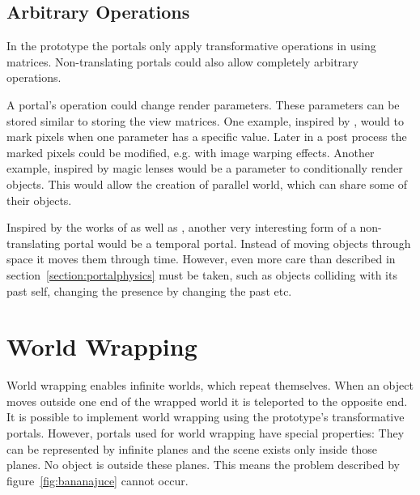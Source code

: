 \subsection{Arbitrary Operations}

In the prototype the portals only apply transformative operations in using matrices. Non-translating portals could also allow completely arbitrary operations.

A portal's operation could change render parameters. These parameters can be stored similar to storing the view matrices. One example, inspired by \textcite{borst:2009:real}, would to mark pixels when one parameter has a specific value. Later in a post process the marked pixels could be modified, e.g. with image warping effects. Another example, inspired by magic lenses would be a parameter to conditionally render objects. This would allow the creation of parallel world, which can share some of their objects.

Inspired by the works of \textcite{ryall:2005:temporal} as well as \textcite{tiesel:2009:composable}, another very interesting form of a non-translating portal would be a temporal portal. Instead of moving objects through space it moves them through time. However, even more care than described in section~\ref{section:portalphysics} must be taken, such as objects colliding with its past self, changing the presence by changing the past etc.






\section{World Wrapping}
World wrapping enables infinite worlds, which repeat themselves. When an object moves outside one end of the wrapped world it is teleported to the opposite end. It is possible to implement world wrapping using the prototype's transformative portals. However, portals used for world wrapping have special properties: They can be represented by infinite planes and the scene exists only inside those planes. No object is outside these planes. This means the problem described by figure~\ref{fig:bananajuce} cannot occur.

